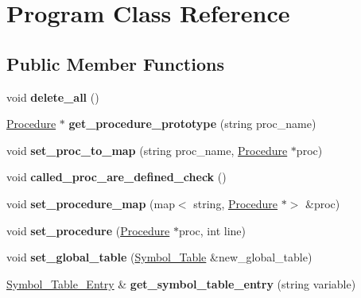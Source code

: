 \hypertarget{classProgram}{}\section{Program Class Reference}
\label{classProgram}
\subsection*{Public Member Functions}
\begin{DoxyCompactItemize}
\item 
\mbox{\label{classProgram_ac3f95156b03682c2508523962abcbd18}} 
void {\bfseries delete\+\_\+all} ()
\item 
\mbox{\label{classProgram_adccd7571cec24cf64f22c3ac73a6407e}} 
\hyperlink{classProcedure}{Procedure} $\ast$ {\bfseries get\+\_\+procedure\+\_\+prototype} (string proc\+\_\+name)
\item 
\mbox{\label{classProgram_ac19c7cce514b98bb27c0bc2fafb31645}} 
void {\bfseries set\+\_\+proc\+\_\+to\+\_\+map} (string proc\+\_\+name, \hyperlink{classProcedure}{Procedure} $\ast$proc)
\item 
\mbox{\label{classProgram_aad148d2a90634f698e006352ceb19fe5}} 
void {\bfseries called\+\_\+proc\+\_\+are\+\_\+defined\+\_\+check} ()
\item 
\mbox{\label{classProgram_ac0630a98b9fb6198a07ec0044c4a0de7}} 
void {\bfseries set\+\_\+procedure\+\_\+map} (map$<$ string, \hyperlink{classProcedure}{Procedure} $\ast$$>$ \&proc)
\item 
\mbox{\label{classProgram_a13156bc0b9bab6b729010ee8572f0f04}} 
void {\bfseries set\+\_\+procedure} (\hyperlink{classProcedure}{Procedure} $\ast$proc, int line)
\item 
\mbox{\label{classProgram_adc447425a4b38f83afc52805b922a021}} 
void {\bfseries set\+\_\+global\+\_\+table} (\hyperlink{classSymbol__Table}{Symbol\+\_\+\+Table} \&new\+\_\+global\+\_\+table)
\item 
\mbox{\label{classProgram_ad9c445349520e9782f76200002834f76}} 
\hyperlink{classSymbol__Table__Entry}{Symbol\+\_\+\+Table\+\_\+\+Entry} \& {\bfseries get\+\_\+symbol\+\_\+table\+\_\+entry} (string variable)
$$
\end{DoxyCompactItemize}
